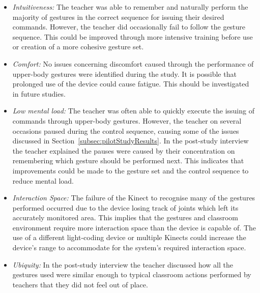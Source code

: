 \documentclass[link]{IWCOMP}
\begin{document}
   \begin{itemize}
   \item \textit{{Intuitiveness:}}  The teacher was able to remember and naturally perform the majority of gestures in the correct sequence for issuing their desired commands.
   However, the teacher did occasionally fail to follow the gesture sequence.
   This could be improved through more intensive training before use or creation of a more cohesive gesture set.
   \item \textit{{Comfort:}}  No issues concerning discomfort caused through the performance of upper-body gestures were identified during the study.
   It is possible that prolonged use of the device could cause fatigue.
   This should be investigated in future studies.
   \item \textit{{Low mental load:}}  The teacher was often able to quickly execute the issuing of commands through upper-body gestures.
   However, the teacher on several occasions paused during the control sequence, causing some of the issues discussed in Section~\ref{subsec:pilotStudyResults}.
   In the post-study interview the teacher explained the pauses were caused by their concentration on remembering which gesture should be performed next.
   This indicates that improvements could be made to the gesture set and the control sequence to reduce mental load.
   \item \textit{{Interaction Space:}} The failure of the Kinect to recognise many of the gestures performed occurred due to the device losing track of joints which left its accurately monitored area.
   This implies that the gestures and classroom environment require more interaction space than the device is capable of.
   The use of a different light-coding device or multiple Kinects could increase the device's range to accommodate for the system's required interaction space.
   \item \textit{{Ubiquity:}} In the post-study interview the teacher discussed how all the gestures used were similar enough to typical classroom actions performed by teachers that they did not feel out of place.\\ 
   \end{itemize}
\end{document}
